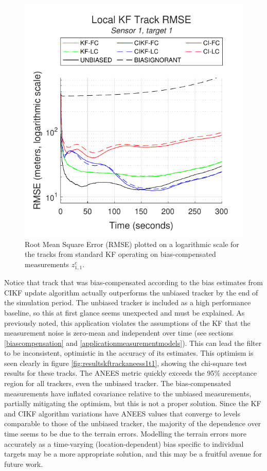 \documentclass[journal]{IEEEtran}
\begin{document}
\begin{figure}[ht]
    \centering
    \includegraphics[scale=0.85]{kftrack_rmse_s1t1.pdf}
    \caption{Root Mean Square Error (RMSE) plotted on a logarithmic scale for the tracks from standard KF operating on bias-compensated measurements $z_{1,1}^c$.}
    \label{fig:resultskftrackrmses1t1}
\end{figure}

Notice that track that was bias-compensated according to the bias estimates from CIKF update algorithm actually outperforms the unbiased tracker by the end of the simulation period. The unbiased tracker is included as a high performance baseline, so this at first glance seems unexpected and must be explained. As previously noted, this application violates the assumptions of the KF that the measurement noise is zero-mean and independent over time (see sections \ref{biascompensation} and \ref{applicationmeasurementmodels}). This can lead the filter to be inconsistent, optimistic in the accuracy of its estimates. This optimism is seen clearly in figure \ref{fig:resultskftrackaneess1t1}, showing the chi-square test results for these tracks. The ANEES metric quickly exceeds the 95\% acceptance region for all trackers, even the unbiased tracker. The bias-compensated measurements have inflated covariance relative to the unbiased measurements, partially mitigating the optimism, but this is not a proper solution. Since the KF and CIKF algorithm variations have ANEES values that converge to levels comparable to those of the unbiased tracker, the majority of the dependence over time seems to be due to the terrain errors. Modelling the terrain errors more accurately as a time-varying (location-dependent) bias specific to individual targets may be a more appropriate solution, and this may be a fruitful avenue for future work.
\end{document}
